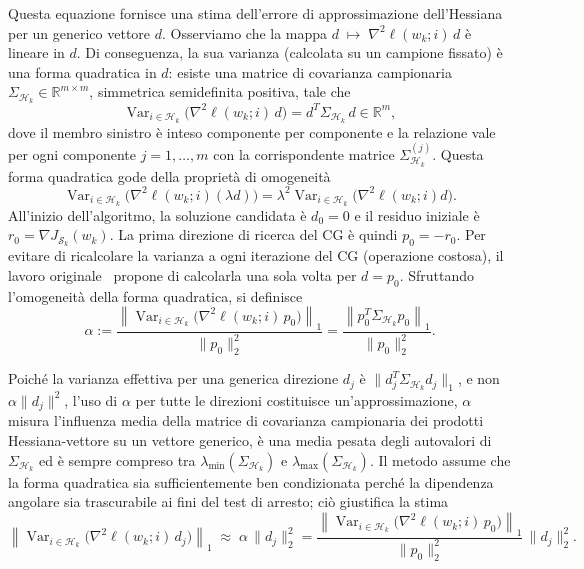 \documentclass[italian, a4paper, twoside, binding=6mm]{sapthesis}
\begin{document}
Questa equazione fornisce una stima dell'errore di approssimazione dell'Hessiana per un generico vettore $d$.
Osserviamo che la mappa 
$d \;\longmapsto\; \nabla^2\ell(w_k;i)\,d$
è lineare in $d$. Di conseguenza, la sua varianza (calcolata su un campione fissato) è una forma quadratica in $d$: esiste una matrice di covarianza campionaria $\Sigma_{\mathcal{H}_k} \in \mathbb{R}^{m\times m}$, simmetrica semidefinita positiva, tale che
\[
\operatorname{Var}_{i\in\mathcal{H}_k}\bigl(\nabla^2\ell(w_k;i)\,d\bigr)
= d^T \Sigma_{\mathcal{H}_k}\, d \in \mathbb{R}^m,
\]
dove il membro sinistro è inteso componente per componente e la relazione vale per ogni componente $j=1,\dots,m$ con la corrispondente matrice $\Sigma_{\mathcal{H}_k}^{(j)}$. Questa forma quadratica gode della proprietà di omogeneità
\[
\operatorname{Var}_{i\in\mathcal{H}_k}\bigl(\nabla^2\ell(w_k;i)(\lambda d)\bigr)
= \lambda^2 \operatorname{Var}_{i\in\mathcal{H}_k}\bigl(\nabla^2\ell(w_k;i)d\bigr).
\]
\medskip
\noindent
All'inizio dell'algoritmo, la soluzione candidata è $d_0 = 0$ e il residuo iniziale è $r_0 = \nabla J_{\mathcal{S}_k}(w_k)$. La prima direzione di ricerca del CG è quindi $p_0 = -r_0$. 
Per evitare di ricalcolare la varianza a ogni iterazione del CG (operazione costosa), il lavoro originale~\cite{byrd2012} propone di calcolarla una sola volta per $d = p_0$. Sfruttando l'omogeneità della forma quadratica, si definisce
\[
\alpha := \frac{\left\| \operatorname{Var}_{i\in\mathcal{H}_k}\bigl(\nabla^2\ell(w_k;i)\,p_0\bigr) \right\|_1}{\|p_0\|_2^2}
= \frac{\left\| p_0^T \Sigma_{\mathcal{H}_k} p_0 \right\|_1}{\|p_0\|_2^2}.
\tag{5.36}
\]

Poiché la varianza effettiva per una generica direzione $d_j$ è $\|d_j^T \Sigma_{\mathcal{H}_k} d_j\|_1$, e non $\alpha\|d_j\|^2$, l'uso di $\alpha$ per tutte le direzioni costituisce un'approssimazione, $\alpha$ misura l'influenza media della matrice di covarianza campionaria dei prodotti Hessiana-vettore su un vettore generico, è una media pesata degli autovalori di $\Sigma_{\mathcal{H}_k}$ ed è sempre compreso tra $\lambda_{\min}(\Sigma_{\mathcal{H}_k})$ e $\lambda_{\max}(\Sigma_{\mathcal{H}_k})$. Il metodo assume che la forma quadratica sia sufficientemente ben condizionata perché la dipendenza angolare sia trascurabile ai fini del test di arresto; ciò giustifica la stima
\[\left\| \operatorname{Var}_{i\in\mathcal{H}_k}\bigl(\nabla^2\ell(w_k;i)\,d_j\bigr) \right\|_1
\;\approx\;
\alpha \, \|d_j\|_2^2
=
\frac{\left\| \operatorname{Var}_{i\in\mathcal{H}_k}\bigl(\nabla^2\ell(w_k;i)\,p_0\bigr) \right\|_1}{\|p_0\|_2^2} \, \|d_j\|_2^2.
\tag{5.37}
\]
\end{document}
